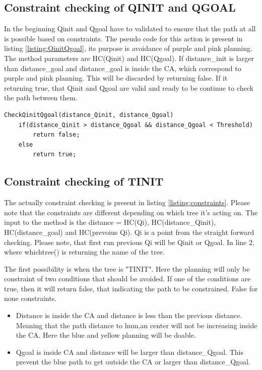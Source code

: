 \subsection{Constraint checking of QINIT and QGOAL}
In the beginning Qinit and Qgoal have to validated to ensure that the path at all is possible based on constraints. The pseudo code for this action is present in listing \ref{listing:QinitQgoal}, its purpose is avoidance of purple and pink planning. The method parameters are HC(Qinit) and HC(Qgoal). If distance\_init is larger than distance\_goal and distance\_goal is inside the CA, which correspond to purple and pink planning. This will be discarded by returning false. If it returning true, that Qinit and Qgoal are valid and ready to be continue to check the path between them.

\begin{lstlisting}[caption=Peseudo code of validate function of Qinit and Qgoal, label=listing:QinitQgoal]
CheckQinitQgoal(distance_Qinit, distance_Qgoal)
	if(distance_Qinit > distance_Qgoal && distance_Qgoal < Threshold)
		return false;
	else 
		return true;
\end{lstlisting}

\subsection{Constraint checking of TINIT}
The actually constraint checking is present in listing \ref{listing:constraints}. Please note that the constraints are different depending on which tree it's acting on.
The input to the method is the distance = HC(Qi), HC(distance\_Qinit), HC(distance\_goal)  and HC(prevoius Qi). Qi is a point from the straight forward checking.
Please note, that first run previous Qi will be Qinit or Qgoal.
In line 2, where whichtree() is returning the name of the tree. 

The first possibility is when the tree is "TINIT". Here the planning will only be constraint of two conditions that should be avoided. If one of the conditions are true, then it will return false, that indicating the path to be constrained. False for none constraints.
\begin{itemize}
\item Distance is inside the CA and distance is less than the previous distance. Meaning that the path distance to hum,an center will not be increasing inside the CA. Here the blue and yellow planning will be doable.
\item Qgoal is inside CA and distance will be larger than distance\_Qgoal. This prevent the blue path to get outside the CA or larger than distance\_Qgoal.
\end{itemize}

